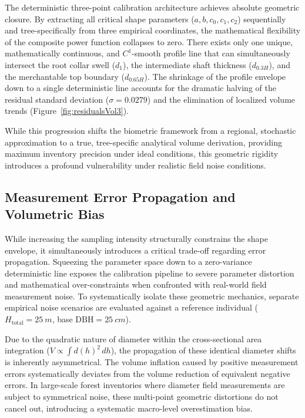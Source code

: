 \documentclass[twocolumn, bibliography=totoc]{scrartcl}
\begin{document}
The deterministic three-point calibration architecture achieves absolute geometric closure. By extracting all critical shape parameters ($a, b, c_0, c_1, c_2$) sequentially and tree-specifically from three empirical coordinates, the mathematical flexibility of the composite power function collapses to zero. There exists only one unique, mathematically continuous, and $C^1$-smooth profile line that can simultaneously intersect the root collar swell ($d_1$), the intermediate shaft thickness ($d_{0.3H}$), and the merchantable top boundary ($d_{0.65H}$). The shrinkage of the profile envelope down to a single deterministic line accounts for the dramatic halving of the residual standard deviation ($\sigma = 0.0279$) and the elimination of localized volume trends (Figure~\ref{fig:residualsVol3}). 

While this progression shifts the biometric framework from a regional, stochastic approximation to a true, tree-specific analytical volume derivation, providing maximum inventory precision under ideal conditions, this geometric rigidity introduces a profound vulnerability under realistic field noise conditions.

\subsection{Measurement Error Propagation and Volumetric Bias}

While increasing the sampling intensity structurally constrains the shape envelope, it simultaneously introduces a critical trade-off regarding error propagation. Squeezing the parameter space down to a zero-variance deterministic line exposes the calibration pipeline to severe parameter distortion and mathematical over-constraints when confronted with real-world field measurement noise. To systematically isolate these geometric mechanics, separate empirical noise scenarios are evaluated against a reference individual ($H_{\text{total}} = \qty{25}{m}$, base $\text{DBH} = \qty{25}{cm}$).

Due to the quadratic nature of diameter within the cross-sectional area integration ($V \propto \int d(h)^2 \, dh$), the propagation of these identical diameter shifts is inherently asymmetrical. The volume inflation caused by positive measurement errors systematically deviates from the volume reduction of equivalent negative errors. In large-scale forest inventories where diameter field measurements are subject to symmetrical noise, these multi-point geometric distortions do not cancel out, introducing a systematic macro-level overestimation bias.
\end{document}
